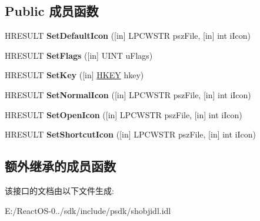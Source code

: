 \subsection*{Public 成员函数}
\begin{DoxyCompactItemize}
\item 
\mbox{\label{interface_i_default_extract_icon_init_a547c8ac7e683ebef0417eee56125a1ed}} 
H\+R\+E\+S\+U\+LT {\bfseries Set\+Default\+Icon} (\mbox{[}in\mbox{]} L\+P\+C\+W\+S\+TR psz\+File, \mbox{[}in\mbox{]} int i\+Icon)
\item 
\mbox{\label{interface_i_default_extract_icon_init_a003ba4205fda1a9268b1bf39122a2b66}} 
H\+R\+E\+S\+U\+LT {\bfseries Set\+Flags} (\mbox{[}in\mbox{]} U\+I\+NT u\+Flags)
\item 
\mbox{\label{interface_i_default_extract_icon_init_a039112692a5e3c47770f8fd8ebd01b35}} 
H\+R\+E\+S\+U\+LT {\bfseries Set\+Key} (\mbox{[}in\mbox{]} \hyperlink{interfacevoid}{H\+K\+EY} hkey)
\item 
\mbox{\label{interface_i_default_extract_icon_init_aa384a6915d80a6adf5521485a0416eaa}} 
H\+R\+E\+S\+U\+LT {\bfseries Set\+Normal\+Icon} (\mbox{[}in\mbox{]} L\+P\+C\+W\+S\+TR psz\+File, \mbox{[}in\mbox{]} int i\+Icon)
\item 
\mbox{\label{interface_i_default_extract_icon_init_a98f58033cc3b6e2dfdcfceaadad33766}} 
H\+R\+E\+S\+U\+LT {\bfseries Set\+Open\+Icon} (\mbox{[}in\mbox{]} L\+P\+C\+W\+S\+TR psz\+File, \mbox{[}in\mbox{]} int i\+Icon)
\item 
\mbox{\label{interface_i_default_extract_icon_init_a40c802c86552781a6dac76d6bd4c421d}} 
H\+R\+E\+S\+U\+LT {\bfseries Set\+Shortcut\+Icon} (\mbox{[}in\mbox{]} L\+P\+C\+W\+S\+TR psz\+File, \mbox{[}in\mbox{]} int i\+Icon)
\end{DoxyCompactItemize}
\subsection*{额外继承的成员函数}


该接口的文档由以下文件生成\+:\begin{DoxyCompactItemize}
\item 
E\+:/\+React\+O\+S-\/0../sdk/include/psdk/shobjidl.\+idl\end{DoxyCompactItemize}
